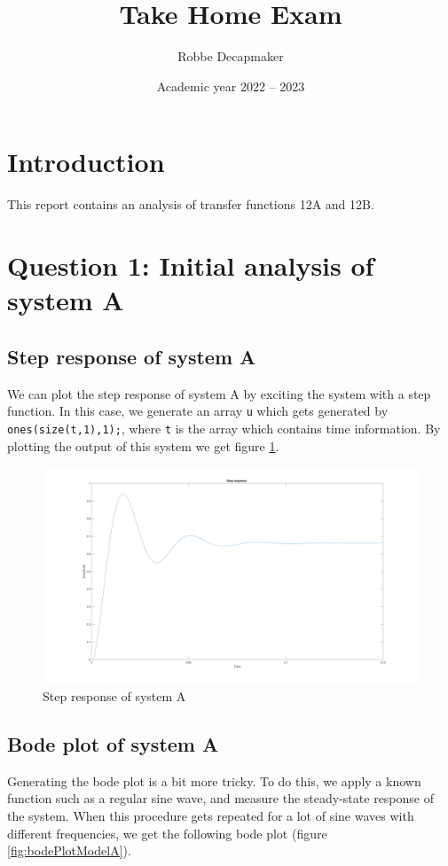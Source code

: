 \documentclass[a4paper,kul]{kulakarticle} %
\date{Academic year 2022 -- 2023}
\title{Take Home Exam}
\author{Robbe Decapmaker}
\newcommand{\matlab}[1]{\lstinline[style=Matlab-editor]!#1!}
\begin{document}
	\maketitle  
	\section*{Introduction}
		This report contains an analysis of transfer functions 12A and 12B.  
	\section{Question 1: Initial analysis of system A}
		\subsection{Step response of system A}	
			We can plot the step response of system A by exciting the system with a  step function. In this case, we generate an array \matlab{u} which gets generated by \matlab{ones(size(t,1),1);}, where \matlab{t} is the array which contains time information. By plotting the output of this system we get figure \ref{fig:stepResponseModelA}.
			
			\begin{figure}[h]
				\centering
				\includegraphics[width=1\linewidth]{stepResponseSystemA}
				\caption[Step response of system A]{Step response of system A}
				\label{fig:stepResponseModelA}
			\end{figure}
		
		\newpage
		\subsection{Bode plot of system A}
			Generating the bode plot is a bit more tricky. To do this, we apply a known function such as a regular sine wave, and measure the steady-state response of the system. When this procedure gets repeated for a lot of sine waves with different frequencies, we get the following bode plot (figure \ref{fig:bodePlotModelA}).  \\
		
\end{document}
